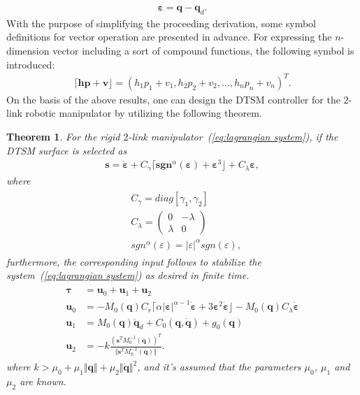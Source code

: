 \documentclass[3p]{elsarticle}
\theoremstyle{plain}
\newtheorem{mythm}{Theorem}
\theoremstyle{remark}
\begin{document}
\begin{align}
\bm \varepsilon = \bm q -\bm q_d.
\end{align}
With the purpose of simplifying the proceeding derivation, some symbol definitions for vector operation are presented in advance. For expressing the $n$-dimension vector including a sort of compound functions, the following symbol is introduced:
\begin{align*}
\lceil\bm h\bm p+\bm v\rfloor = (h_1p_1+v_1,h_2p_2+v_2,\ldots,h_np_n+v_n)^T.
\end{align*}
On the basis of the above results, one can design the DTSM controller for the $2$-link robotic manipulator by utilizing the following theorem.
\begin{mythm}\label{theorem:4}
For the rigid $2$-link manipulator~(\ref{eq:lagrangian system}), if the DTSM surface is selected as
\begin{align}
\bm s = \dot{\bm \varepsilon}+C_\gamma\lceil\bm{sgn}^\alpha(\bm \varepsilon)+\bm\varepsilon^3\rfloor+C_\lambda{\bm\varepsilon},\label{eq:lagrangian surface}
\end{align}
where
\begin{align}
\begin{split}
&C_\gamma=diag[\gamma_1,\gamma_2]\\
&C_\lambda=
\begin{pmatrix}
0 &-\lambda\\ \lambda &0
\end{pmatrix}\\
&{sgn}^\alpha(\varepsilon)=\vert\varepsilon\vert^\alpha sgn(\varepsilon),
\end{split}
\end{align}
furthermore, the corresponding input follows to stabilize the system~(\ref{eq:lagrangian system}) as desired in finite time.
\begin{align}
\begin{split}
\bm\tau &= \bm u_0+\bm u_1 +\bm u_2\\
\bm u_0 &= -M_0(\bm q)C_r\lceil\alpha\vert\bm\varepsilon\vert^{\alpha-1}\dot{\bm \varepsilon}+3\bm \varepsilon^2\dot{\bm \varepsilon}\rfloor-M_0(\bm q)C_\lambda\dot{\bm \varepsilon}\\
\bm u_1 &= M_0(\bm q)\ddot {\bm q}_d+C_0(\bm q,\dot {\bm q})+g_0(\bm q)\\
\bm u_2 &= -k\frac{(\bm s^TM_0^{-1}(\bm q))^T}{\Vert\bm s^TM_0^{-1}(\bm q)\Vert}.
\end{split}
\end{align}
where $k>\mu_0+\mu_1\Vert\bm q\Vert+\mu_2\Vert\dot{\bm q}\Vert^2$, and it's assumed that the parameters $\mu_0$, $\mu_1$ and $\mu_2$ are known.
\end{mythm}
\end{document}
